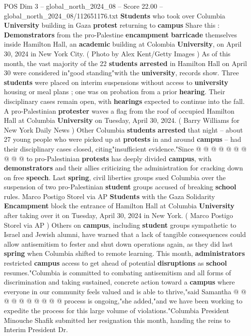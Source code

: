 \begin{textsample}{POS Dim 3 – global\_north\_2024\_08 – Score 22.00 – global\_north\_2024\_08/112651176.txt}  \label{ex:f3_pos_140}
\textbf{Students} who took over Columbia \textbf{University} building in Gaza \textbf{protest} returning to \textbf{campus} Share this : \textbf{Demonstrators} from the pro-Palestine \textbf{encampment} \textbf{barricade} themselves inside Hamilton Hall, an \textbf{academic} building at Colombia \textbf{University}, on April 30, 2024 in New York City. ( Photo by Alex Kent/Getty Images ) As of this month, the vast majority of the 22 \textbf{students} \textbf{arrested} in Hamilton Hall on April 30 were considered in"good standing"with the \textbf{university}, records show.
Three \textbf{students} were placed on interim suspensions without access to \textbf{university} housing or meal plans ; one was on probation from a prior \textbf{hearing}.
Their disciplinary cases remain open, with \textbf{hearings} expected to continue into the fall.
A pro-Palestinian \textbf{protester} waves a flag from the roof of occupied Hamilton Hall at Columbia \textbf{University} on Tuesday, April 30, 2024. ( Barry Williams for New York Daily News ) Other Columbia \textbf{students} \textbf{arrested} that night -- about 27 young people who were picked up at \textbf{protests} in and around \textbf{campus} -- had their disciplinary cases closed, citing"insufficient evidence."Since @ @ @ @ @ @ @ @ @ @ to pro-Palestinian \textbf{protests} has deeply divided \textbf{campus}, with \textbf{demonstrators} and their allies criticizing the administration for cracking down on free \textbf{speech}.
Last \textbf{spring}, civil liberties groups sued Columbia over the suspension of two pro-Palestinian \textbf{student} groups accused of breaking \textbf{school} rules.
Marco Postigo Storel via AP \textbf{Students} with the Gaza Solidarity \textbf{Encampment} block the entrance of Hamilton Hall at Columbia \textbf{University} after taking over it on Tuesday, April 30, 2024 in New York. ( Marco Postigo Storel via AP ) Others on \textbf{campus}, including \textbf{student} groups sympathetic to Israel and Jewish alumni, have warned that a lack of tangible consequences could allow antisemitism to fester and shut down operations again, as they did last \textbf{spring} when Columbia shifted to remote learning.
This month, \textbf{administrators} restricted \textbf{campus} access to get ahead of potential \textbf{disruptions} as \textbf{school} resumes."Columbia is committed to combating antisemitism and all forms of discrimination and taking sustained, concrete action toward a \textbf{campus} where everyone in our community feels valued and is able to thrive,"said Samantha @ @ @ @ @ @ @ @ @ @ process is ongoing,"she added,"and we have been working to expedite the process for this large volume of violations."Columbia President Minouche Shafik submitted her resignation this month, handing the reins to Interim President Dr.

\end{textsample}
